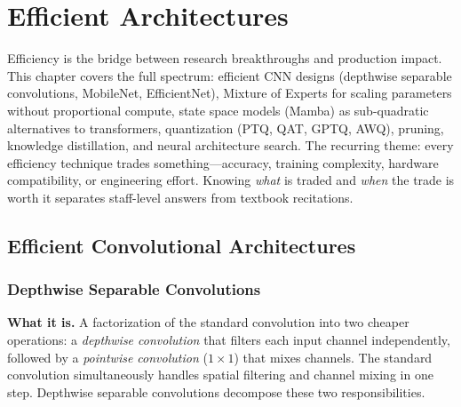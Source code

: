 \chapter{Efficient Architectures}
\label{chap:efficient_architectures}

\begin{tldr}
Efficiency is the bridge between research breakthroughs and production impact. This chapter covers the full spectrum: efficient CNN designs (depthwise separable convolutions, MobileNet, EfficientNet), Mixture of Experts for scaling parameters without proportional compute, state space models (Mamba) as sub-quadratic alternatives to transformers, quantization (PTQ, QAT, GPTQ, AWQ), pruning, knowledge distillation, and neural architecture search. The recurring theme: every efficiency technique trades something---accuracy, training complexity, hardware compatibility, or engineering effort. Knowing \textit{what} is traded and \textit{when} the trade is worth it separates staff-level answers from textbook recitations.
\end{tldr}

\section{Efficient Convolutional Architectures}
\label{sec:efficient_cnns}

\subsection{Depthwise Separable Convolutions}

\textbf{What it is.} A factorization of the standard convolution into two cheaper operations: a \textit{depthwise convolution} that filters each input channel independently, followed by a \textit{pointwise convolution} ($1 \times 1$) that mixes channels. The standard convolution simultaneously handles spatial filtering and channel mixing in one step. Depthwise separable convolutions decompose these two responsibilities.

